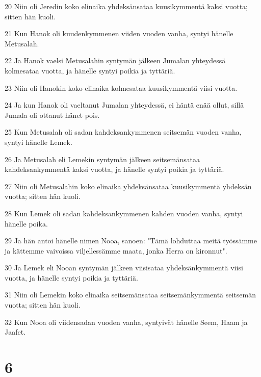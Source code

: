 \par 20 Niin oli Jeredin koko elinaika yhdeksänsataa kuusikymmentä kaksi vuotta; sitten hän kuoli.
\par 21 Kun Hanok oli kuudenkymmenen viiden vuoden vanha, syntyi hänelle Metusalah.
\par 22 Ja Hanok vaelsi Metusalahin syntymän jälkeen Jumalan yhteydessä kolmesataa vuotta, ja hänelle syntyi poikia ja tyttäriä.
\par 23 Niin oli Hanokin koko elinaika kolmesataa kuusikymmentä viisi vuotta.
\par 24 Ja kun Hanok oli vaeltanut Jumalan yhteydessä, ei häntä enää ollut, sillä Jumala oli ottanut hänet pois.
\par 25 Kun Metusalah oli sadan kahdeksankymmenen seitsemän vuoden vanha, syntyi hänelle Lemek.
\par 26 Ja Metusalah eli Lemekin syntymän jälkeen seitsemänsataa kahdeksankymmentä kaksi vuotta, ja hänelle syntyi poikia ja tyttäriä.
\par 27 Niin oli Metusalahin koko elinaika yhdeksänsataa kuusikymmentä yhdeksän vuotta; sitten hän kuoli.
\par 28 Kun Lemek oli sadan kahdeksankymmenen kahden vuoden vanha, syntyi hänelle poika.
\par 29 Ja hän antoi hänelle nimen Nooa, sanoen: "Tämä lohduttaa meitä työssämme ja kättemme vaivoissa viljellessämme maata, jonka Herra on kironnut".
\par 30 Ja Lemek eli Nooan syntymän jälkeen viisisataa yhdeksänkymmentä viisi vuotta, ja hänelle syntyi poikia ja tyttäriä.
\par 31 Niin oli Lemekin koko elinaika seitsemänsataa seitsemänkymmentä seitsemän vuotta; sitten hän kuoli.
\par 32 Kun Nooa oli viidensadan vuoden vanha, syntyivät hänelle Seem, Haam ja Jaafet.

\chapter{6}

